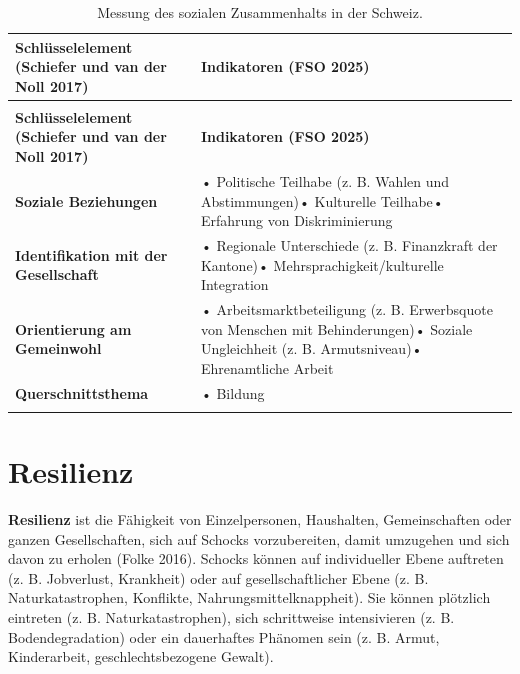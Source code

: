 \documentclass[
  nswissgerman,
  a4paper,
  DIV=11,
  numbers=noendperiod,
  oneside,
  openany]{scrreprt}
\begin{document}
\begin{longtable}[t]{>{\raggedright\arraybackslash}p{5.5cm}>{\raggedright\arraybackslash}p{5.5cm}}

\caption{\label{tbl-social-cohesion-switzerland}Messung des sozialen
Zusammenhalts in der Schweiz.}

\tabularnewline

\toprule
\textbf{Schlüsselelement (Schiefer und van der Noll 2017)} & \textbf{Indikatoren (FSO 2025)}\\
\midrule
\endfirsthead
\multicolumn{2}{@{}l}{\textit{(continued)}}\\
\toprule
\textbf{Schlüsselelement (Schiefer und van der Noll 2017)} & \textbf{Indikatoren (FSO 2025)}\\
\midrule
\endhead

\endfoot
\bottomrule
\endlastfoot
\textbf{Soziale Beziehungen} & • Politische Teilhabe (z. B. Wahlen und Abstimmungen)\newline • Kulturelle Teilhabe\newline • Erfahrung von Diskriminierung\\
\textbf{Identifikation mit der Gesellschaft} & • Regionale Unterschiede (z. B. Finanzkraft der Kantone)\newline • Mehrsprachigkeit/kulturelle Integration\\
\textbf{Orientierung am Gemeinwohl} & • Arbeitsmarktbeteiligung (z. B. Erwerbsquote von Menschen mit Behinderungen)\newline • Soziale Ungleichheit (z. B. Armutsniveau)\newline • Ehrenamtliche Arbeit\\
\textbf{Querschnittsthema} & • Bildung\\*

\end{longtable}

\endgroup{}

\section{Resilienz}\label{resilienz}

\textbf{Resilienz} ist die Fähigkeit von Einzelpersonen, Haushalten,
Gemeinschaften oder ganzen Gesellschaften, sich auf Schocks
vorzubereiten, damit umzugehen und sich davon zu erholen (Folke 2016).
Schocks können auf individueller Ebene auftreten (z. B. Jobverlust,
Krankheit) oder auf gesellschaftlicher Ebene (z. B. Naturkatastrophen,
Konflikte, Nahrungsmittelknappheit). Sie können plötzlich eintreten (z.
B. Naturkatastrophen), sich schrittweise intensivieren (z. B.
Bodendegradation) oder ein dauerhaftes Phänomen sein (z. B. Armut,
Kinderarbeit, geschlechtsbezogene Gewalt).
\end{document}
